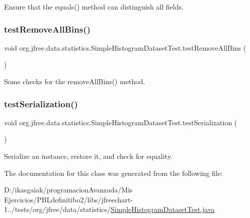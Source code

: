 Ensure that the equals() method can distinguish all fields. \mbox{\label{classorg_1_1jfree_1_1data_1_1statistics_1_1_simple_histogram_dataset_test_a93cbfc462acf3d597092e309397da999}} 
\subsubsection{\texorpdfstring{test\+Remove\+All\+Bins()}{testRemoveAllBins()}}
{\footnotesize\ttfamily void org.\+jfree.\+data.\+statistics.\+Simple\+Histogram\+Dataset\+Test.\+test\+Remove\+All\+Bins (\begin{DoxyParamCaption}{ }\end{DoxyParamCaption})}

Some checks for the remove\+All\+Bins() method. \mbox{\label{classorg_1_1jfree_1_1data_1_1statistics_1_1_simple_histogram_dataset_test_aa61d59f1842959a103fd59f7cccbc0c2}} 
\subsubsection{\texorpdfstring{test\+Serialization()}{testSerialization()}}
{\footnotesize\ttfamily void org.\+jfree.\+data.\+statistics.\+Simple\+Histogram\+Dataset\+Test.\+test\+Serialization (\begin{DoxyParamCaption}{ }\end{DoxyParamCaption})}

Serialize an instance, restore it, and check for equality. 

The documentation for this class was generated from the following file\+:\begin{DoxyCompactItemize}
\item 
D\+:/ikasgaiak/programacion\+Avanzada/\+Mis Ejercicios/\+P\+B\+Ldefinitibo2/libs/jfreechart-\/1../tests/org/jfree/data/statistics/\mbox{\hyperlink{_simple_histogram_dataset_test_8java}{Simple\+Histogram\+Dataset\+Test.\+java}}\end{DoxyCompactItemize}

